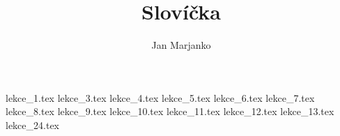 \documentclass[article]{jlreq}
\title{Slovíčka}
\author{Jan Marjanko}
\begin{document}
\maketitle
\tableofcontents
\newpage

{lekce_1.tex}
{lekce_3.tex}
{lekce_4.tex}
{lekce_5.tex}
{lekce_6.tex}
{lekce_7.tex}
{lekce_8.tex}
{lekce_9.tex}
{lekce_10.tex}
{lekce_11.tex}
{lekce_12.tex}
{lekce_13.tex}
{lekce_24.tex}
\end{document}
